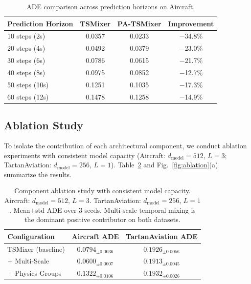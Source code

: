 \documentclass[letterpaper,journal]{IEEEtran}
\begin{document}
\begin{table}[!t]
\caption{ADE comparison across prediction horizons on Aircraft.\label{tab:predlen}}
\centering
\footnotesize
\setlength{\tabcolsep}{3pt}
\begin{tabular}{lccc}
\toprule
Prediction Horizon & TSMixer & PA-TSMixer & Improvement \\
\midrule
10 steps (2s)  & 0.0357 & 0.0233 & $-$34.8\% \\
20 steps (4s)  & 0.0492 & 0.0379 & $-$23.0\% \\
30 steps (6s)  & 0.0786 & 0.0615 & $-$21.7\% \\
40 steps (8s)  & 0.0975 & 0.0852 & $-$12.7\% \\
50 steps (10s) & 0.1251 & 0.1035 & $-$17.3\% \\
60 steps (12s) & 0.1478 & 0.1258 & $-$14.9\% \\
\bottomrule
\end{tabular}
\end{table}

\subsection{Ablation Study}
To isolate the contribution of each architectural component, we conduct ablation
experiments with consistent model capacity (Aircraft: $d_{\text{model}}\!=\!512$,
$L\!=\!3$; TartanAviation: $d_{\text{model}}\!=\!256$, $L\!=\!1$).
Table~\ref{tab:ablation} and Fig.~\ref{fig:ablation}(a) summarize the results.

\begin{table}[!t]
\caption{Component ablation study with consistent model capacity. Aircraft:
$d_{\text{model}}\!=\!512$, $L\!=\!3$. TartanAviation: $d_{\text{model}}\!=\!256$,
$L\!=\!1$. Mean$\pm$std ADE over 3 seeds. Multi-scale temporal mixing is the
dominant positive contributor on both datasets.\label{tab:ablation}}
\centering
\begin{tabular}{lcc}
\toprule
Configuration & Aircraft ADE & TartanAviation ADE \\
\midrule
TSMixer (baseline)      & $0.0794_{\pm 0.0036}$ & $0.1926_{\pm 0.0056}$ \\
$+$ Multi-Scale         & $\mathbf{0.0600_{\pm 0.0007}}$ & $0.1913_{\pm 0.0045}$ \\
$+$ Physics Groups      & $0.1322_{\pm 0.0106}$ & $0.1932_{\pm 0.0026}$ \\
\bottomrule
\end{tabular}
\end{table}
\end{document}
